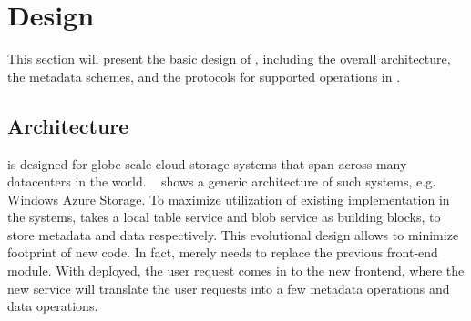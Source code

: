 









\section{Design}

This section will present the basic design of {\name}, including the overall architecture,
the metadata schemes, and the protocols for supported operations in {\name}. 

\subsection{Architecture}
{\name} is designed for globe-scale cloud storage systems that span across many datacenters in
the world. ~ shows a generic architecture of such systems, e.g. Windows Azure
Storage. To maximize utilization of existing implementation in the systems, {\name} takes a local table service and
blob service as building blocks, to store metadata and data respectively. This evolutional
design allows {\name} to minimize footprint of new code. In fact, {\name} merely needs to replace the previous front-end
module. With {\name} deployed, the user request comes in to the new frontend, where the new
{\name} service will translate the user requests into a few metadata operations and data operations.

